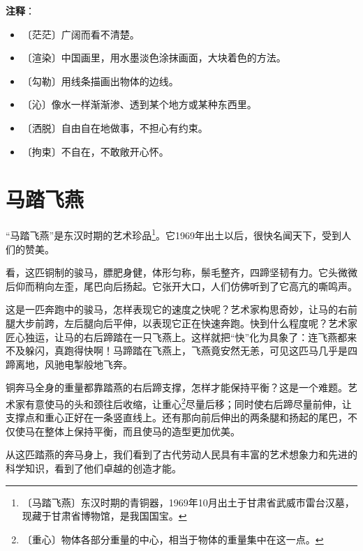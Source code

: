 \documentclass[12pt,UTF-8,openany]{ctexbook}
\begin{document}
\newpage

\textbf{注释}：

\vspace{-1em}

\begin{itemize}
    \setlength\itemsep{-0.2em}
    \item 〔茫茫〕广阔而看不清楚。
    \item 〔渲染〕中国画里，用水墨淡色涂抹画面，大块着色的方法。
    \item 〔勾勒〕用线条描画出物体的边线。
    \item 〔沁〕像水一样渐渐渗、透到某个地方或某种东西里。
    \item 〔洒脱〕自由自在地做事，不担心有约束。
    \item 〔拘束〕不自在，不敢敞开心怀。
\end{itemize}

\chapter{马踏飞燕}

\begin{Large}
    
    “马踏飞燕”是东汉时期的艺术珍品\footnote{〔马踏飞燕〕东汉时期的青铜器，1969年10月出土于甘肃省武威市雷台汉墓，现藏于甘肃省博物馆，是我国国宝。}。它1969年出土以后，很快名闻天下，受到人们的赞美。
    
    看，这匹铜制的骏马，膘肥身健，体形匀称，鬃毛整齐，四蹄坚韧有力。它头微微后仰而稍向左歪，尾巴向后扬起。它张开大口，人们仿佛听到了它高亢的嘶鸣声。
    
    这是一匹奔跑中的骏马，怎样表现它的速度之快呢？艺术家构思奇妙，让马的右前腿大步前跨，左后腿向后平伸，以表现它正在快速奔跑。快到什么程度呢？艺术家匠心独运，让马的右后蹄踏在一只飞燕上。这样就把“快”化为具象了：连飞燕都来不及躲闪，真跑得快啊！马蹄踏在飞燕上，飞燕竟安然无恙，可见这匹马几乎是四蹄离地，风驰电掣般地飞奔。
    
    铜奔马全身的重量都靠踏燕的右后蹄支撑，怎样才能保持平衡？这是一个难题。艺术家有意使马的头和颈往后收缩，让重心\footnote{〔重心〕物体各部分重量的中心，相当于物体的重量集中在这一点。}尽量后移；同时使右后蹄尽量前伸，让支撑点和重心正好在一条竖直线上。还有那向前后伸出的两条腿和扬起的尾巴，不仅使马在整体上保持平衡，而且使马的造型更加优美。
    
    从这匹踏燕的奔马身上，我们看到了古代劳动人民具有丰富的艺术想象力和先进的科学知识，看到了他们卓越的创造才能。
    
\end{Large}
\end{document}
